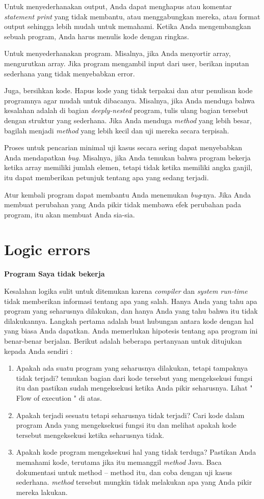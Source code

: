 \documentclass[12pt,b5paper,openright,twoside]{book}
\begin{document}
Untuk menyederhanakan output, Anda dapat menghapus atau komentar \textit{statement print} yang tidak membantu, atau menggabungkan mereka, atau format output sehingga lebih mudah untuk memahami. Ketika Anda mengembangkan sebuah program, Anda harus menulis kode dengan ringkas.

Untuk menyederhanakan program. Misalnya, jika Anda menyortir array, mengurutkan array. Jika program mengambil input dari user, berikan inputan sederhana yang tidak menyebabkan error.

Juga, bersihkan kode. Hapus kode yang tidak terpakai dan atur penulisan kode programnya agar mudah untuk dibacanya. Misalnya, jika Anda menduga bahwa kesalahan adalah di bagian \textit{deeply-nested} program, tulis ulang bagian tersebut dengan struktur yang sederhana. Jika Anda menduga \textit{method} yang lebih besar, bagilah menjadi \textit{method} yang lebih kecil dan uji mereka secara terpisah.

Proses untuk pencarian minimal uji kasus secara sering dapat menyebabkan Anda mendapatkan \textit{bug}. Misalnya, jika Anda temukan bahwa program bekerja ketika array memiliki jumlah elemen, tetapi tidak ketika memiliki angka ganjil, itu dapat memberikan petunjuk tentang apa yang sedang terjadi.

Atur kembali program dapat membantu Anda menemukan \textit{bug}-nya. Jika Anda membuat perubahan yang Anda pikir tidak membawa efek perubahan pada program, itu akan membuat Anda sia-sia.

\section{Logic errors}

\noindent \textbf{Program Saya tidak bekerja}

\noindent Kesalahan logika sulit untuk ditemukan karena \textit{compiler} dan \textit{system run-time} tidak memberikan informasi tentang apa yang salah. Hanya Anda yang tahu apa program yang seharusnya dilakukan, dan hanya Anda yang tahu bahwa itu tidak dilakukannya.
Langkah pertama adalah buat hubungan antara kode dengan hal yang biasa Anda dapatkan. Anda memerlukan hipotesis tentang apa program ini benar-benar berjalan. Berikut adalah beberapa pertanyaan untuk ditujukan kepada Anda sendiri :
\begin{enumerate}
    \item Apakah ada suatu program yang seharusnya dilakukan, tetapi tampaknya tidak terjadi? temukan bagian dari kode tersebut yang mengeksekusi fungsi itu dan pastikan sudah mengeksekusi ketika Anda pikir seharusnya. Lihat " Flow of execution " di atas.
    \item Apakah terjadi sesuatu tetapi seharusnya tidak terjadi? Cari kode dalam program Anda yang mengeksekusi fungsi itu dan melihat apakah kode tersebut mengeksekusi ketika seharusnya tidak.
    \item Apakah kode program mengeksekusi hal yang tidak terduga? Pastikan Anda memahami kode, terutama jika itu memanggil \textit{method} Java. Baca dokumentasi untuk method – method itu, dan coba dengan uji kasus sederhana. \textit{method} tersebut mungkin tidak melakukan apa yang Anda pikir mereka lakukan.
\end{enumerate}
\end{document}

